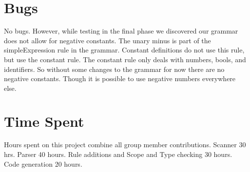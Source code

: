 \documentclass{article}
\begin{document}
\section{Bugs}
No bugs. However, while testing in the final phase we discovered our grammar does
not allow for negative constants. The unary minus is part of the simpleExpression
rule in the grammar. Constant definitions do not use this rule, but use the
constant rule. The constant rule only deals with numbers, bools, and identifiers.
So without some changes to the grammar for now there are no negative constants.
Though it is possible to use negative numbers everywhere else.

\section{Time Spent}
Hours spent on this project combine all group member contributions. Scanner 30 hrs. Parser 40 hours.
Rule additions and Scope and Type checking 30 hours. Code generation 20 hours.
\end{document}
